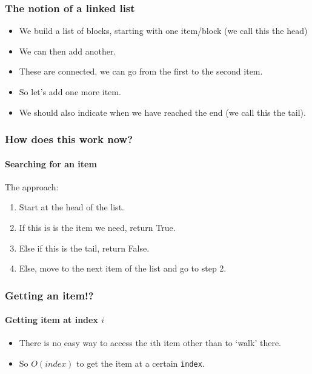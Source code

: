 \begin{frame}
	\frametitle{The notion of a linked list}
			\begin{itemize}
				\item We build a list of blocks, starting with one item/block (we call this the \alert{head})
				\item We can then add another.
				\item These are connected, we can go from the first to the second item.
				\item So let's add one more item.
				\item We should also indicate when we have reached the end (we call this the \alert{tail}).
			\end{itemize}
\end{frame}

\begin{frame}
	\frametitle{How does this work now?}
	\framesubtitle{Searching for an item}	
	The approach:
	\begin{enumerate}
		\item Start at the head of the list.
		\item If this is is the item we need, return True.
		\item Else if this is the tail, return False.
		\item Else, move to the next item of the list and go to step 2.
	\end{enumerate}

	

	

\end{frame}

\begin{frame}
	\frametitle{Getting an item!?}
	\framesubtitle{Getting item at index $i$}

	\begin{itemize}
		\item There is no easy way to access the $i$th item other than to `walk' there.
		\item So $O(\textit{index})$ to get the item at a certain \texttt{index}.
	\end{itemize}
	
\end{frame}

